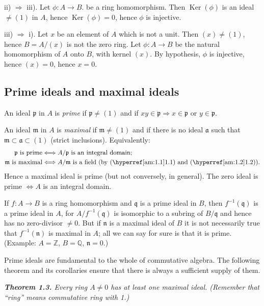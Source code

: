 ii) $\Rightarrow$ iii).  Let $\phi:A\longrightarrow B$. be a ring homomorphism.  Then $\operatorname{Ker}(\phi)$ is an
ideal $\ne(1)$ in $A$, hence $\operatorname{Ker}(\phi)=0$, hence $\phi$ is injective.

iii) $\Rightarrow$ i).  Let $x$ be an element of $A$ which is not a unit.  Then $(x)\ne(1)$,
hence $B=A/(x)$ is not the zero ring.  Let $\phi:A\longrightarrow B$ be the natural homomorphism of $A$ onto $B$, with kernel $(x)$.  By hypothesis, $\phi$ is injective, hence
$(x)=0$, hence $x=0$.\proofbox

\subsection{Prime ideals and maximal ideals}

An ideal $\mathfrak p$ in $A$ is \emph{prime} if $\mathfrak p\ne(1)$ and if $xy\in\mathfrak p\Rightarrow x\in\mathfrak p$ or $y\in\mathfrak p$.

An ideal $\mathfrak m$ in $A$ is \emph{maximal} if $\mathfrak m\ne(1)$ and if there is no ideal $\mathfrak a$ such that
$\mathfrak m\subset\mathfrak a\subset(1)$ (strict inclusions).  Equivalently:
\[
\begin{aligned}
\mathfrak p\text{ is prime}&\Longleftrightarrow A/\mathfrak p\text{ is an integral domain};\\
\mathfrak m\text{ is maximal}&\Longleftrightarrow A/\mathfrak m\text{ is a field (by \amref{1.1} and \amref{1.2}).}
\end{aligned}
\]
Hence a maximal ideal is prime (but not conversely, in general).  The zero ideal
is prime $\Longleftrightarrow A$ is an integral domain.

If $f:A\longrightarrow B$ is a ring homomorphism and $\mathfrak q$ is a prime ideal in $B$, then
$f^{-1}(\mathfrak q)$ is a prime ideal in $A$, for $A/f^{-1}(\mathfrak q)$ is isomorphic to a subring of $B/\mathfrak q$ and
hence has no zero-divisor $\ne0$.  But if $\mathfrak n$ is a maximal ideal of $B$ it is not necessarily true that $f^{-1}(\mathfrak n)$ is maximal in $A$; all we can say for sure is that it is prime.
(Example: $A=\mathbb Z$, $B=\mathbb Q$, $\mathfrak n=0$.)

Prime ideals are fundamental to the whole of commutative algebra.  The
following theorem and its corollaries ensure that there is always a sufficient
supply of them.

\medskip
\noindent\textit{\textbf{Theorem 1.3.} Every ring $A\ne0$ has at least one maximal ideal. (Remember
that ``ring'' means commutative ring with 1.)}

